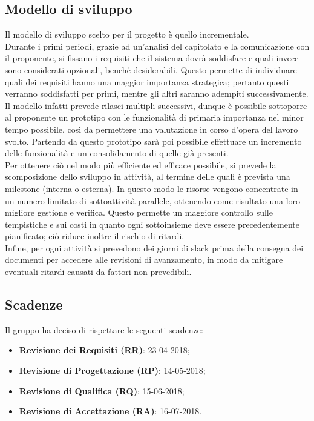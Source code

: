 \subsection{Modello di sviluppo}
Il modello di sviluppo scelto per il progetto è quello incrementale.\\
Durante i primi periodi, grazie ad un'analisi del capitolato e la comunicazione con il proponente, si fissano i requisiti che il sistema dovrà soddisfare e quali invece sono considerati opzionali, benchè desiderabili. Questo permette di individuare quali dei requisiti hanno una maggior importanza strategica; pertanto questi verranno soddisfatti per primi, mentre gli altri saranno adempiti successivamente.\\
Il modello infatti prevede rilasci multipli successivi, dunque è possibile sottoporre al proponente un prototipo con le funzionalità di primaria importanza nel minor tempo possibile, così da permettere una valutazione in corso d’opera del lavoro svolto. Partendo da questo prototipo sarà poi possibile effettuare un incremento delle funzionalità e un consolidamento di quelle già presenti.\\
Per ottenere ciò nel modo più efficiente ed efficace possibile, si prevede la scomposizione dello sviluppo in attività, al termine delle quali è prevista una milestone (interna o esterna). In questo modo le risorse vengono concentrate in un numero limitato di sottoattività parallele, ottenendo come risultato una loro migliore gestione e verifica.
Questo permette un maggiore controllo sulle tempistiche e sui costi in quanto ogni sottoinsieme deve essere precedentemente pianificato; ciò riduce inoltre il rischio di ritardi.\\
Infine, per ogni attività si prevedono dei giorni di slack prima della consegna dei documenti per accedere alle revisioni di avanzamento, in modo da mitigare eventuali ritardi causati da fattori non prevedibili.

\subsection{Scadenze}\label{Scadenze}
Il gruppo \Gruppo ha deciso di rispettare le seguenti scadenze:
\begin{itemize}
	\item \textbf{Revisione dei Requisiti (RR)}: 23-04-2018;
	\item \textbf{Revisione di Progettazione (RP)}: 14-05-2018;
	\item \textbf{Revisione di Qualifica (RQ)}: 15-06-2018;
	\item \textbf{Revisione di Accettazione (RA)}: 16-07-2018.
\end{itemize}
